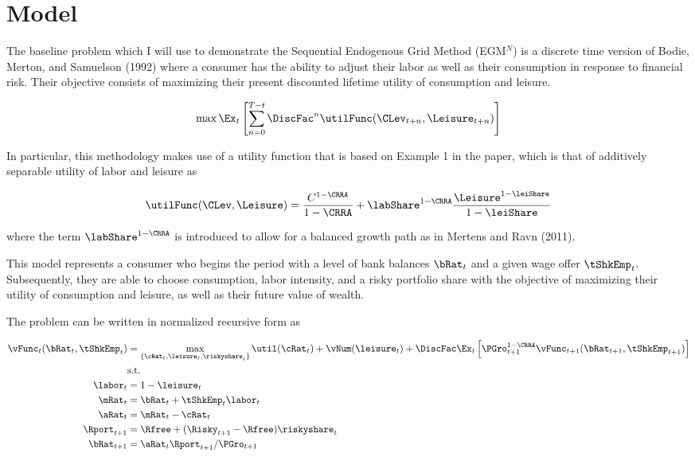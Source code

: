 \documentclass[\econtexRoot/EGMN]{subfiles}
\begin{document}
\notinsubfile{\renewcommand{\econtexRoot}{.}}

\hypertarget{model}{}\par\section{Model}
\notinsubfile{\label{sec:model}}

The baseline problem which I will use to demonstrate the Sequential Endogenous Grid Method (EGM$^N$) is a discrete time version of Bodie, Merton, and Samuelson (1992) where a consumer has the ability to adjust their labor as well as their consumption in response to financial risk. Their objective consists of maximizing their present discounted lifetime utility of consumption and leisure.

\begin{equation}
    \max \Ex_{t} \left[ \sum_{n = 0}^{T-t} \DiscFac^{n} \utilFunc(\CLev_{t+n}, \Leisure_{t+n})  \right]
\end{equation}

In particular, this methodology makes use of a utility function that is based on Example 1 in the paper, which is that of additively separable utility of labor and leisure as

\begin{equation}
    \utilFunc(\CLev, \Leisure) = \frac{C^{1-\CRRA}}{1-\CRRA} + \labShare^{1-\CRRA} \frac{\Leisure^{1-\leiShare}}{1-\leiShare}
\end{equation}

where the term $\labShare^{1-\CRRA}$ is introduced to allow for a balanced growth path as in Mertens and Ravn (2011).

This model represents a consumer who begins the period with a level of bank balances $\bRat_{t}$ and a given wage offer $\tShkEmp_{t}$. Subsequently, they are able to choose consumption, labor intensity, and a risky portfolio share with the objective of maximizing their utility of consumption and leisure, as well as their future value of wealth.

The problem can be written in normalized recursive form as

\begin{equation}
    \begin{split}
        \vFunc_{t}(\bRat_{t}, \tShkEmp_{t}) & = \max_{\{\cRat_{t},
            \leisure_{t}, \riskyshare_{t}\}} \util(\cRat_{t}) +
        \vNum(\leisure_{t}) +
        \DiscFac \Ex_{t} \left[ \PGro_{t+1}^{1-\CRRA}
            \vFunc_{t+1} (\bRat_{t+1},
            \tShkEmp_{t+1}) \right] \\
        & \text{s.t.} \\
        \labor_{t} & = 1 - \leisure_{t} \\
        \mRat_{t} & = \bRat_{t} + \tShkEmp_{t}\labor_{t} \\
        \aRat_{t} & = \mRat_{t} - \cRat_{t} \\
        \Rport_{t+1} & = \Rfree + (\Risky_{t+1} - \Rfree)
        \riskyshare_{t} \\
        \bRat_{t+1} & = \aRat_{t} \Rport_{t+1} / \PGro_{t+1}
    \end{split}
\end{equation}
\end{document}
